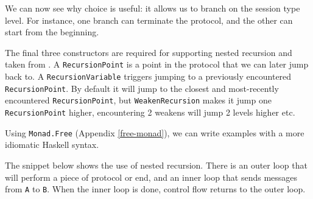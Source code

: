 \documentclass[runningheads,plain]{llncs}
\newenvironment{Shaded}{}{}
\newcommand{\KeywordTok}[1]{\textcolor[rgb]{0.00,0.44,0.13}{\textbf{#1}}}
\newcommand{\DataTypeTok}[1]{\textcolor[rgb]{0.56,0.13,0.00}{#1}}
\newcommand{\StringTok}[1]{\textcolor[rgb]{0.25,0.44,0.63}{#1}}
\newcommand{\CommentTok}[1]{\textcolor[rgb]{0.38,0.63,0.69}{\textit{#1}}}
\newcommand{\FunctionTok}[1]{\textcolor[rgb]{0.02,0.16,0.49}{#1}}
\newcommand{\NormalTok}[1]{#1}
\begin{document}
We can now see why choice is useful: it allows us to branch on the
session type level. For instance, one branch can terminate the protocol,
and the other can start from the beginning.

The final three constructors are required for supporting nested
recursion and taken from \cite{van2017session}. A
\texttt{RecursionPoint} is a point in the protocol that we can later
jump back to. A \texttt{RecursionVariable} triggers jumping to a
previously encountered \texttt{RecursionPoint}. By default it will jump
to the closest and most-recently encountered \texttt{RecursionPoint},
but \texttt{WeakenRecursion} makes it jump one \texttt{RecursionPoint}
higher, encountering 2 weakens will jump 2 levels higher etc.

Using \texttt{Monad.Free} (Appendix \ref{free-monad}), we can write
examples with a more idiomatic Haskell syntax.

The snippet below shows the use of nested recursion. There is an outer
loop that will perform a piece of protocol or end, and an inner loop
that sends messages from \texttt{A} to \texttt{B}. When the inner loop
is done, control flow returns to the outer loop.

\begin{Shaded}
\end{Shaded}
\end{document}
